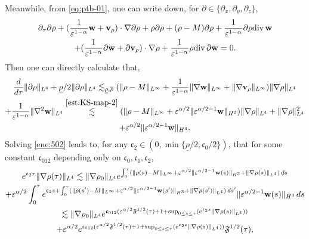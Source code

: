 \documentclass[11pt]{article}
\theoremstyle{plain}
\theoremstyle{definition}
\theoremstyle{remark}
\newcommand{\dtau}{\partial_\tau}
\newcommand{\dv}{\mathrm{div}\, }
\renewcommand{\vec}[1]{{\bf #1}}
\newcommand{\norm}[2]{\Vert #1 \Vert_{#2}}
\numberwithin{equation}{section}
\begin{document}
Meanwhile, from \eqref{eq:ptb-01}, one can write down, for $ \partial \in \lbrace \partial_x, \partial_y, \partial_z \rbrace $,
\begin{equation}
    \label{ene:501}
\begin{gathered}
    \dtau \partial \rho + (\frac{1}{\varepsilon^{1-\alpha}}\vec w + \vec v_\rho) \cdot \nabla \partial \rho + \rho \partial \rho + (\rho - M)\partial\rho + \frac{1}{\varepsilon^{1-\alpha}} \partial \rho \dv \vec w \\
    + (\frac{1}{\varepsilon^{1-\alpha}} \partial \vec w + \partial \vec v_\rho) \cdot \nabla \rho + \frac{1}{\varepsilon^{1-\alpha}} \rho \dv \partial \vec w = 0.
\end{gathered}
\end{equation}
Then one can directly calculate that, 
\begin{equation}
    \label{ene:502}
    \begin{gathered}
        \dfrac{d}{d\tau} \norm{\partial\rho}{L^4} + \underline \rho/2 \norm{\partial \rho}{L^4} \lesssim_{\underline\rho,\overline\rho} (\norm{\rho-M}{L^\infty} + \frac{1}{\varepsilon^{1-\alpha}} \norm{\nabla \vec w}{L^\infty} + \norm{\nabla \vec v_\rho}{L^\infty})\norm{\nabla\rho}{L^4}\\
        + \frac{1}{\varepsilon^{1-\alpha}} \norm{\nabla^2 \vec w}{L^4} \stackrel{\eqref{est:KS-map-2}}{\lesssim} (\norm{\rho-M}{L^\infty} + \varepsilon^{\alpha/2} \norm{\varepsilon^{\alpha/2-1}\vec w}{H^3} )\norm{\nabla\rho}{L^4} + \norm{\nabla\rho}{L^4}^2\\
        + \varepsilon^{\alpha/2} \norm{\varepsilon^{\alpha/2-1}\vec w}{H^3}.
    \end{gathered}
\end{equation}
Solving \eqref{ene:502} leads to, for any $ \mathfrak c_2 \in (0,\min\lbrace \underline\rho/2, \mathfrak c_0 /2 \rbrace) $, that for some constant $ \mathfrak c_{012} $ depending only on $ \mathfrak c_0, \mathfrak c_1, \mathfrak c_2 $, 
\begin{equation}
    \label{ene:503}
    \begin{gathered}
    e^{\mathfrak c_2 \tau}\norm{\nabla \rho(\tau)}{L^4} \lesssim \norm{\nabla \rho_0}{L^4} e^{\int_0^\tau (\norm{\rho(s) - M}{L^\infty} + \varepsilon^{\alpha/2}\norm{\varepsilon^{\alpha/2-1}\vec w(s)}{H^3} + \norm{\nabla \rho (s)}{L^4} ) \,ds} \\
    + \varepsilon^{\alpha/2} \int_0^\tau e^{\mathfrak c_2 s + \int_0^\tau (\norm{\rho(s') - M}{L^\infty} + \varepsilon^{\alpha/2}\norm{\varepsilon^{\alpha/2-1}\vec w(s')}{H^3} + \norm{\nabla \rho (s')}{L^4} ) \,ds' } \norm{\varepsilon^{\alpha/2-1}\vec w(s)}{H^3} \,ds \\
    \lesssim \norm{\nabla \rho_0}{L^4} e^{\mathfrak c_{012} ( \varepsilon^{\alpha/2} \mathfrak F^{1/2}(\tau) + 1 + \sup_{0\leq s \leq \tau} (e^{\mathfrak c_2 s} \norm{\nabla\rho(s)}{L^4}) )  } \\
    + \varepsilon^{\alpha/2} e^{\mathfrak c_{012} ( \varepsilon^{\alpha/2} \mathfrak F^{1/2}(\tau) + 1 + \sup_{0\leq s \leq \tau} (e^{\mathfrak c_2 s} \norm{\nabla\rho(s)}{L^4}) )  } \mathfrak F^{1/2}(\tau),
    \end{gathered}
\end{equation}
\end{document}
